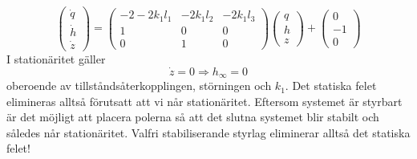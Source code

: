 \documentclass[12pt]{article}
\begin{document}
\[\begin{pmatrix}
  \dot{q}\\
  \dot{h}\\
  \dot{z}
\end{pmatrix} = \begin{pmatrix}
-2-2k_1l_1 & -2k_1l_2 & -2k_1l_3 \\
1 & 0 & 0 \\
0 & 1 & 0
\end{pmatrix}\begin{pmatrix}
q \\
h \\
z
\end{pmatrix} + \begin{pmatrix}
0 \\
-1 \\
0
\end{pmatrix}  \]
I stationäritet gäller
\[\dot{z} = 0 \Rightarrow h_{\infty} = 0\]
oberoende av tillståndsåterkopplingen, störningen och $k_1$. Det statiska felet elimineras alltså förutsatt att vi når stationäritet. Eftersom systemet är styrbart är det möjligt att placera polerna så att det slutna systemet blir stabilt och således når stationäritet. Valfri stabiliserande styrlag eliminerar alltså det statiska felet!
\end{document}
